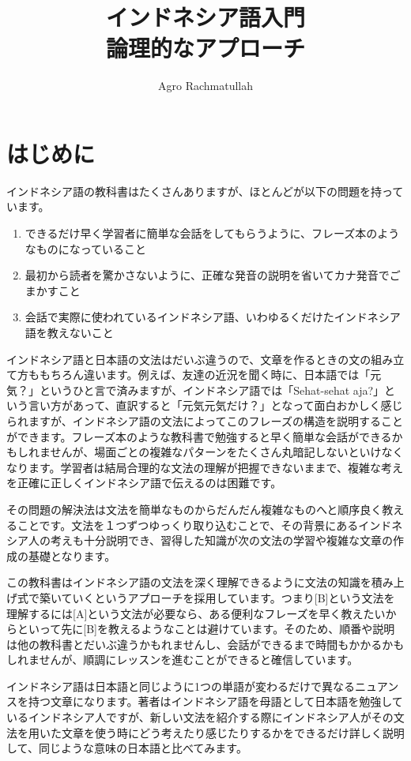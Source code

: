 \documentclass[uplatex]{jsarticle}
\title{%
  インドネシア語入門 \\
  \large 論理的なアプローチ}
\author{Agro Rachmatullah}
\begin{document}
\maketitle

\tableofcontents

\section{はじめに}

インドネシア語の教科書はたくさんありますが、ほとんどが以下の問題を持っています。

\begin{enumerate}
  \item できるだけ早く学習者に簡単な会話をしてもらうように、フレーズ本のようなものになっていること
  \item 最初から読者を驚かさないように、正確な発音の説明を省いてカナ発音でごまかすこと
  \item 会話で実際に使われているインドネシア語、いわゆるくだけたインドネシア語を教えないこと
\end{enumerate}

インドネシア語と日本語の文法はだいぶ違うので、文章を作るときの文の組み立て方ももちろん違います。例えば、友達の近況を聞く時に、日本語では「元気？」というひと言で済みますが、インドネシア語では「Sehat-sehat aja?」という言い方があって、直訳すると「元気元気だけ？」となって面白おかしく感じられますが、インドネシア語の文法によってこのフレーズの構造を説明することができます。フレーズ本のような教科書で勉強すると早く簡単な会話ができるかもしれませんが、場面ごとの複雑なパターンをたくさん丸暗記しないといけなくなります。学習者は結局合理的な文法の理解が把握できないままで、複雑な考えを正確に正しくインドネシア語で伝えるのは困難です。

その問題の解決法は文法を簡単なものからだんだん複雑なものへと順序良く教えることです。文法を１つずつゆっくり取り込むことで、その背景にあるインドネシア人の考えも十分説明でき、習得した知識が次の文法の学習や複雑な文章の作成の基礎となります。

この教科書はインドネシア語の文法を深く理解できるように文法の知識を積み上げ式で築いていくというアプローチを採用しています。つまり[B]という文法を理解するには[A]という文法が必要なら、ある便利なフレーズを早く教えたいからといって先に[B]を教えるようなことは避けています。そのため、順番や説明は他の教科書とだいぶ違うかもれませんし、会話ができるまで時間もかかるかもしれませんが、順調にレッスンを進むことができると確信しています。

インドネシア語は日本語と同じように1つの単語が変わるだけで異なるニュアンスを持つ文章になります。著者はインドネシア語を母語として日本語を勉強しているインドネシア人ですが、新しい文法を紹介する際にインドネシア人がその文法を用いた文章を使う時にどう考えたり感じたりするかをできるだけ詳しく説明して、同じような意味の日本語と比べてみます。
\end{document}
